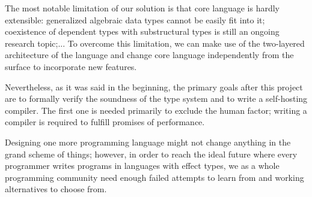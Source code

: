 \documentclass[a4paper,14pt]{extreport}
\begin{document}
The most notable limitation of our solution is that core language is hardly
extensible: generalized algebraic data types cannot be easily fit into it;
coexistence of dependent types with substructural types is still an ongoing
research topic;... To overcome this limitation, we can make use of the
two-layered architecture of the language and change core language independently
from the surface to incorporate new features.

Nevertheless, as it was said in the beginning, the primary goals after this
project are to formally verify the soundness of the type system and to write a
self-hosting compiler. The first one is needed primarily to exclude the human
factor; writing a compiler is required to fulfill promises of performance.

Designing one more programming language might not change anything in the grand
scheme of things; however, in order to reach the ideal future where every
programmer writes programs in languages with effect types, we as a whole
programming community need enough failed attempts to learn from and working
alternatives to choose from.



\end{document}

